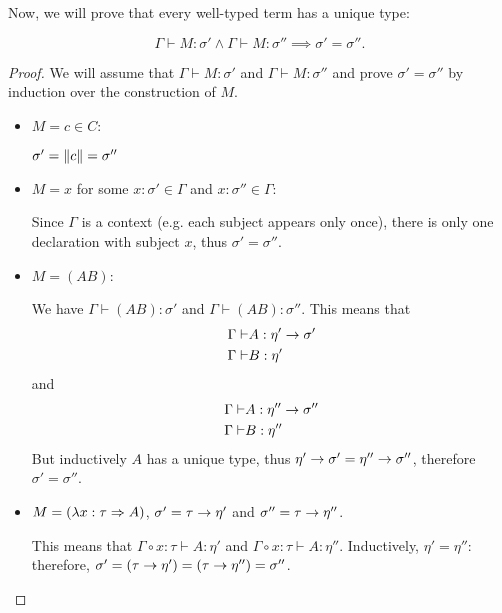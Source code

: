 \documentclass[main.tex]{subfiles}
\begin{document}
Now, we will prove that every well-typed term has a unique type:
\begin{prop}
    \label{prop:uniquetypespure}
    \[ \Gamma \vdash M : \sigma' \land \Gamma \vdash M : \sigma''
        \implies \sigma' = \sigma''. \]
\end{prop}
\begin{proof}
    We will assume that $\Gamma \vdash M : \sigma'$ and $\Gamma \vdash M : \sigma''$
    and prove $\sigma' = \sigma''$ by induction over the construction of $M$.

    \begin{itemize}
        \item $M = c \in C$:

            $\sigma' = \|c\| = \sigma''$

        \item $M = x$ for some $x : \sigma' \in \Gamma$ and $x : \sigma'' \in \Gamma$:

            Since $\Gamma$ is a context (e.g. each subject appears only once),
            there is only one declaration with subject $x$, thus $\sigma' = \sigma''$.

        \item $M = (AB)$:

            We have $\Gamma \vdash (AB) : \sigma'$ and $\Gamma \vdash (AB) : \sigma''$.
            This means that
            \begin{align*}
                \Gamma \vdash& A : \eta' \rightarrow \sigma'\\
                \Gamma \vdash& B : \eta'
            \end{align*}
            and
            \begin{align*}
                \Gamma \vdash& A : \eta'' \rightarrow \sigma''\\
                \Gamma \vdash& B : \eta''
            \end{align*}
            But inductively $A$ has a unique type, thus $\eta' \rightarrow \sigma'
            = \eta'' \rightarrow \sigma''$, therefore $\sigma' = \sigma''$.

        \item $M = (\lambda x : \tau \Rightarrow A)$, $\sigma' = \tau \rightarrow \eta'$
            and $\sigma'' = \tau \rightarrow \eta''$.

            This means that $\Gamma \circ x : \tau \vdash A : \eta'$ and
            $\Gamma \circ x : \tau \vdash A : \eta''$. Inductively, $\eta'
            = \eta''$: therefore, $\sigma' = (\tau \rightarrow \eta') = (\tau \rightarrow \eta'')
            = \sigma''$.
    \end{itemize}
\end{proof}
\end{document}
